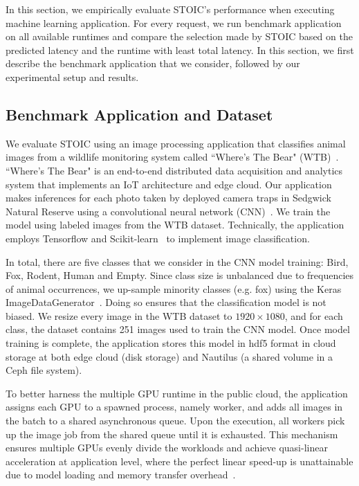 In this section, we empirically evaluate STOIC's performance when executing machine learning application. For every request, we run benchmark application on all available runtimes and compare the selection made by STOIC based on the predicted latency and the runtime with least total latency. In this section, we first describe the benchmark application that we consider, followed by our experimental setup and results. 

\subsection{Benchmark Application and Dataset}

We evaluate STOIC using an image processing application that classifies animal images from a wildlife monitoring system called ``Where's The Bear" (WTB)~\cite{ref:wtb}. ``Where's The Bear" is an end-to-end distributed data acquisition and analytics system that implements an IoT architecture and edge cloud. Our application makes inferences for each photo taken by deployed camera traps in Sedgwick Natural Reserve using a convolutional neural network (CNN)~\cite{ref:cnn}.  We train the model using labeled images from the WTB dataset. Technically, the application employs Tensorflow and Scikit-learn~\cite{ref:scikit} to implement image classification.  

In total, there are five classes that we consider in the CNN model training: Bird, Fox, Rodent, Human and Empty. Since class size is unbalanced due to frequencies of animal occurrences, we up-sample minority classes (e.g. fox) using the Keras ImageDataGenerator~\cite{ref:keras}.  Doing so ensures that the classification model is not biased. We resize every image in the WTB dataset to $1920 \times 1080$, and for each class, the dataset contains 251 images used to train the CNN model. Once model training is complete, the application stores this model in hdf5 format in cloud storage at both edge cloud (disk storage) and Nautilus (a shared volume in a Ceph file system).

To better harness the multiple GPU runtime in the public cloud, the application assigns each GPU to a spawned process, namely worker, and adds all images in the batch to a shared asynchronous queue. Upon the execution, all workers pick up the image job from the shared queue until it is exhausted. This mechanism ensures multiple GPUs evenly divide the workloads and achieve quasi-linear acceleration at application level, where the perfect linear speed-up is unattainable due to model loading and memory transfer overhead~\cite{ref:multi_gpu}. 

